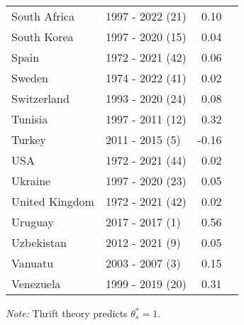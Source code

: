 \begin{table}[H]
{{\begin{tabular}{llrr}
South Africa & 1997 - 2022 (21) & 0.10\\
South Korea & 1997 - 2020 (15) & 0.04\\
Spain & 1972 - 2021 (42) & 0.06\\
\addlinespace
Sweden & 1974 - 2022 (41) & 0.02\\
Switzerland & 1993 - 2020 (24) & 0.08\\
Tunisia & 1997 - 2011 (12) & 0.32\\
Turkey & 2011 - 2015 (5) & -0.16\\
USA & 1972 - 2021 (44) & 0.02\\
\addlinespace
Ukraine & 1997 - 2020 (23) & 0.05\\
United Kingdom & 1972 - 2021 (42) & 0.02\\
Uruguay & 2017 - 2017 (1) & 0.56\\
Uzbekistan & 2012 - 2021 (9) & 0.05\\
Vanuatu & 2003 - 2007 (3) & 0.15\\
\addlinespace
Venezuela & 1999 - 2019 (20) & 0.31\\
\end{tabular}

}

}
\bottomrule
\label{tbl-indicator_table}
\begin{flushleft}
\footnotesize \emph{Note:} Thrift theory predicts \(\theta_s^* = 1\).
\end{flushleft}
\end{table}